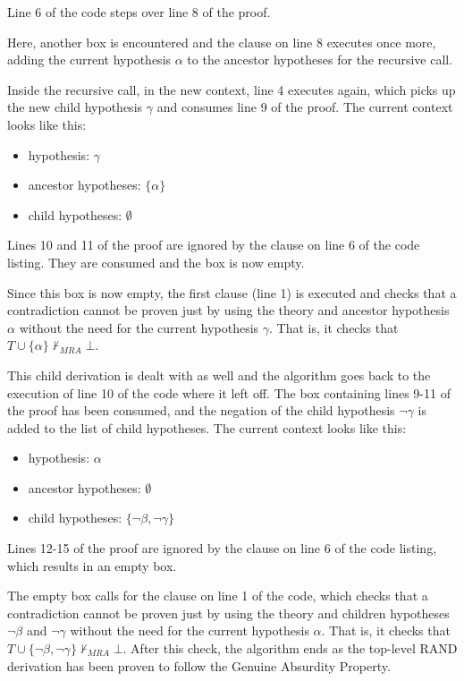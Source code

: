 \documentclass[11pt,twoside,a4paper]{report}
\begin{document}
Line 6 of the code steps over line 8 of the proof.

Here, another box is encountered and the clause on line 8 executes once more, adding the current hypothesis $\alpha$ to the ancestor hypotheses for the recursive call.

Inside the recursive call, in the new context, line 4 executes again, which picks up the new child hypothesis $\gamma$ and consumes line 9 of the proof. The current context looks like this:
\begin{itemize}
\item
hypothesis: $\gamma$
\item
ancestor hypotheses: $\{\alpha\}$
\item
child hypotheses: $\emptyset$
\end{itemize}

Lines 10 and 11 of the proof are ignored by the clause on line 6 of the code listing. They are consumed and the box is now empty.

Since this box is now empty, the first clause (line 1) is executed and checks that a contradiction cannot be proven just by using the theory and ancestor hypothesis $\alpha$ without the need for the current hypothesis $\gamma$. That is, it checks that $T\cup\{\alpha\}\nvdash_{MRA}\bot$.

This child derivation is dealt with as well and the algorithm goes back to the execution of line 10 of the code where it left off. The box containing lines 9-11 of the proof has been consumed, and the negation of the child hypothesis $\neg\gamma$ is added to the list of child hypotheses. The current context looks like this:
\begin{itemize}
\item
hypothesis: $\alpha$
\item
ancestor hypotheses: $\emptyset$
\item
child hypotheses: $\{\neg\beta, \neg\gamma\}$
\end{itemize}

Lines 12-15 of the proof are ignored by the clause on line 6 of the code listing, which results in an empty box.

The empty box calls for the clause on line 1 of the code, which checks that a contradiction cannot be proven just by using the theory and children hypotheses $\neg\beta$ and $\neg\gamma$ without the need for the current hypothesis $\alpha$. That is, it checks that $T\cup\{\neg\beta, \neg\gamma\}\nvdash_{MRA}\bot$. After this check, the algorithm ends as the top-level RAND derivation has been proven to follow the Genuine Absurdity Property.
\end{document}
